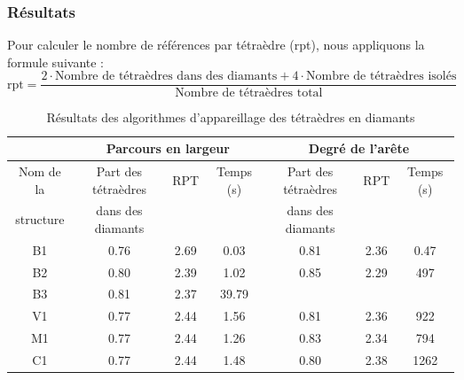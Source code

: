 \documentclass[a4paper,11pt,openany]{article}
\begin{document}
\subsubsection{Résultats}
\noindent
Pour calculer le nombre de références par tétraèdre (rpt), nous appliquons la formule suivante :\\
\begin{equation}
\text{rpt} = \frac{2\cdot \text{Nombre de tétraèdres dans des diamants}+4\cdot \text{Nombre de tétraèdres isolés}}{\text{Nombre de tétraèdres total}}
\end{equation}
\begin{table}[H]
\centering
\footnotesize
\begin{tabular}{|c | c | c | c| c | c | c |}
\hline
& \multicolumn{3}{|c|}{Parcours en largeur}& \multicolumn{3}{|c|}{Degré de l'arête}\\
\hline
Nom de la & Part des tétraèdres & RPT & Temps (s) & Part des tétraèdres & RPT & Temps (s)\\
structure&dans des diamants&&&dans des diamants&&\\
\hline
B1 & 0.76 & 2.69 & 0.03 & 0.81 & 2.36 & 0.47 \\
B2 &  0.80 & 2.39 & 1.02 & 0.85 & 2.29 & 497 \\
B3 & 0.81 & 2.37 & 39.79 &  &  &\\
V1 & 0.77 & 2.44 & 1.56 & 0.81 & 2.36 & 922\\
M1 & 0.77 & 2.44 & 1.26 & 0.83 & 2.34 & 794\\
C1 & 0.77 & 2.44 & 1.48 & 0.80 & 2.38 & 1262\\
\hline  
\end{tabular}
\label{tab:results_performances}
\caption{Résultats des algorithmes d'appareillage des tétraèdres en diamants}
\end{table}
\end{document}
